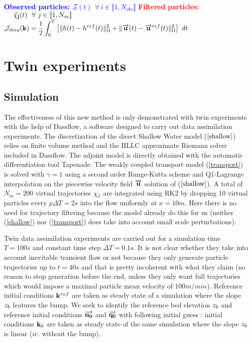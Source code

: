 \vskip 0.3cm
\textcolor{blue}{\textbf{Observed particles:}$\ \ \Xi(t)\ \ \forall\ i \in \llbracket 1,N_{obs} \rrbracket$}
\vskip 0.3cm
\textcolor{red}{\textbf{Filtered particles:}$\ \ \ \ \mathbf{\bar{\chi_j}}(t)\ \ \forall\ j \in \llbracket 1,N_{m} \rrbracket$}
\vskip 0.3cm
$
\mathcal{J}_{diag}(\mathbf{k}) = 
\dfrac{1}{2} \displaystyle \int_0^T \left[ \lVert h(t) - h^{ref}(t) \rVert^2_{\Omega} + \lVert \overrightarrow{\mathbf{u}}(t) - \overrightarrow{\mathbf{u}}^{ref}(t) \rVert^2_{\Omega} \right] \ d\textrm{t}
$
\vskip 0.3cm


\clearpage
\section{Twin experiments}

\subsection{Simulation}

The effectiveness of this new method is only demonstrated with twin experiments with the help of Dassflow,
a software designed to carry out data assimilation experiments.
The discretization of the direct Shallow Water model ($\ref{shallow}$) relies on finite volume method and the HLLC approximate Riemann solver included in Dassflow.
The adjoint model is directly obtained with the automatic differentiation tool Tapenade.
The weakly coupled transport model (\ref{transport}) is solved with $\gamma = 1$ using a second order Runge-Kutta scheme and Q1-Lagrange interpolation on the piecewise velocity field $\overrightarrow{\mathbf{u}}$ solution of ($\ref{shallow}$).
A total of $N_m = 200$ virtual trajectories $\mathbf{\chi}_j$ are integrated using RK2 by dropping 10 virtual particles every $p\Delta T = 2s$ into the flow uniformly at $x=10m$.
Here there is no need for trajectory filtering because the model already do this for us (neither (\ref{shallow}) nor (\ref{transport}) does take into account small scale perturbations).


\vskip 0.3cm
Twin data assimilation experiments are carried out for a simulation time $T = 100s$ and constant time step $\Delta T = 0.1s$. It is not clear whether they take into account inevitable transient flow or not because they only generate particle trajectories up to $t = 40s$ and that is pretty incoherent with what they claim (no reason to stop generation before the end, unless they only want full trajectories which would impose a maximal particle mean velocity of $100m/min$).
Reference initial conditions $\mathbf{k}^{ref}$ are taken as steady state of a simulation where the slope $z_b$ features the bump.
We seek to identify the reference bed elevation $z_b$ and reference initial conditions $\overrightarrow{\mathbf{u_0}}$ and $\overrightarrow{\mathbf{q_0}}$ with following initial guess :
initial conditions $\mathbf{k}_0$ are taken as steady state of the same simulation where the slope $z_b$ is linear ($ie.$ without the bump).

